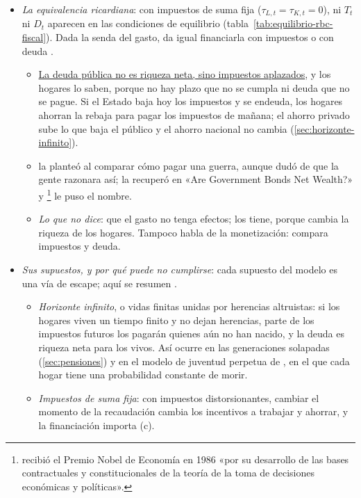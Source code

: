 \documentclass[11pt]{article}
\begin{document}
\begin{itemize}
\item \emph{La equivalencia ricardiana}: con impuestos de suma fija ($\tau_{L,t}=\tau_{K,t}=0$), ni $T_t$ ni $D_t$ aparecen en las condiciones de equilibrio (tabla~\ref{tab:equilibrio-rbc-fiscal}). Dada la senda del gasto, da igual financiarla con impuestos o con deuda\nocite{Barro1974} .
  \begin{itemize}
  \item \uline{La deuda pública no es riqueza neta, sino impuestos aplazados}, y los hogares lo saben, porque no hay plazo que no se cumpla ni deuda que no se pague. Si el Estado baja hoy los impuestos y se endeuda, los hogares ahorran la rebaja para pagar los impuestos de mañana; el ahorro privado sube lo que baja el público y el ahorro nacional no cambia (\ref{sec:horizonte-infinito}).
  \item {} la planteó al comparar cómo pagar una guerra, aunque dudó de que la gente razonara así\nocite{Ricardo1817Principles}; \textcite{Barro1974} la recuperó en «Are Government Bonds Net Wealth?» y \footnote{ recibió el Premio Nobel de Economía en 1986 «por su desarrollo de las bases contractuales y constitucionales de la teoría de la toma de decisiones económicas y políticas»\nocite{Nobel1986Buchanan}.} le puso el nombre\nocite{Buchanan1976Barro}.
  \item \emph{Lo que no dice}: que el gasto no tenga efectos; los tiene, porque cambia la riqueza de los hogares. Tampoco habla de la monetización: compara impuestos y deuda.
  \end{itemize}
\item \emph{Sus supuestos, y por qué puede no cumplirse}: cada supuesto del modelo es una vía de escape; aquí se resumen .
  \begin{itemize}
  \item \emph{Horizonte infinito}, o vidas finitas unidas por herencias altruistas: si los hogares viven un tiempo finito y no dejan herencias, parte de los impuestos futuros los pagarán quienes aún no han nacido, y la deuda es riqueza neta para los vivos. Así ocurre en las generaciones solapadas (\ref{sec:pensiones}) y en el modelo de juventud perpetua de \textcite{Blanchard1985Debt}, en el que cada hogar tiene una probabilidad constante de morir.
  \item \emph{Impuestos de suma fija}: con impuestos distorsionantes, cambiar el momento de la recaudación cambia los incentivos a trabajar y ahorrar, y la financiación importa (c).

\end{itemize}
\end{itemize}
\end{document}
